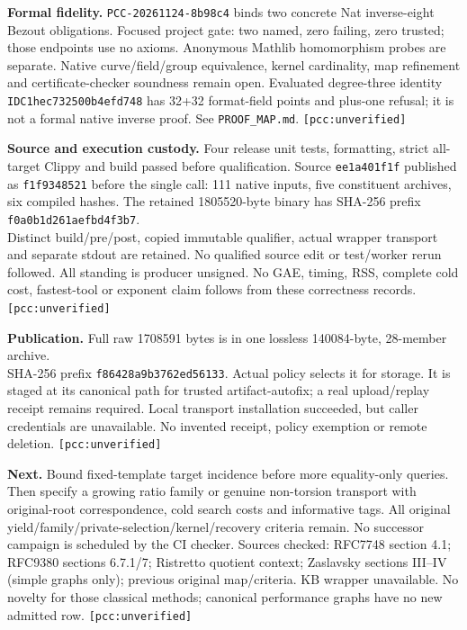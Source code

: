 \documentclass[10pt]{article}
\begin{document}
\textbf{Formal fidelity.} \texttt{PCC-20261124-8b98c4} binds two concrete Nat
inverse-eight Bezout obligations. Focused project gate: two named, zero
failing, zero trusted; those endpoints use no axioms. Anonymous Mathlib
homomorphism probes are separate. Native curve/field/group equivalence,
kernel cardinality, map refinement and certificate-checker soundness remain
open. Evaluated degree-three identity \texttt{IDC1hec732500b4efd748} has 32+32
format-field points and plus-one refusal; it is not a formal native inverse
proof. See \texttt{PROOF\_MAP.md}. \texttt{[pcc:unverified]}

\textbf{Source and execution custody.} Four release unit tests, formatting,
strict all-target Clippy and build passed before qualification. Source
\texttt{ee1a401f1f} published as \texttt{f1f9348521} before the single call:
111 native inputs, five constituent archives, six compiled hashes.
The retained 1805520-byte binary has SHA-256 prefix
\texttt{f0a0b1d261aefbd4f3b7}.\\
Distinct build/pre/post, copied immutable
qualifier, actual wrapper transport and separate stdout are retained. No
qualified source edit or test/worker rerun followed. All standing is producer
unsigned. No GAE, timing, RSS, complete cold cost, fastest-tool or exponent
claim follows from these correctness records. \texttt{[pcc:unverified]}

\textbf{Publication.} Full raw 1708591 bytes is in one lossless 140084-byte,
28-member archive.\\
SHA-256 prefix \texttt{f86428a9b3762ed56133}. Actual policy
selects it for storage. It is staged at its canonical path for trusted
artifact-autofix; a real upload/replay receipt remains required. Local
transport installation succeeded, but caller credentials are unavailable.
No invented receipt, policy exemption or remote deletion.
\texttt{[pcc:unverified]}

\textbf{Next.} Bound fixed-template target incidence before more equality-only
queries. Then specify a growing ratio family or genuine non-torsion transport
with original-root correspondence, cold search costs and informative tags.
All original yield/family/private-selection/kernel/recovery criteria remain.
No successor campaign is scheduled by the CI checker. Sources checked:
RFC7748 section 4.1; RFC9380 sections 6.7.1/7; Ristretto quotient context;
Zaslavsky sections III--IV (simple graphs only); previous original map/criteria.
KB wrapper unavailable. No novelty for those classical methods; canonical
performance graphs have no new admitted row. \texttt{[pcc:unverified]}
\end{document}
